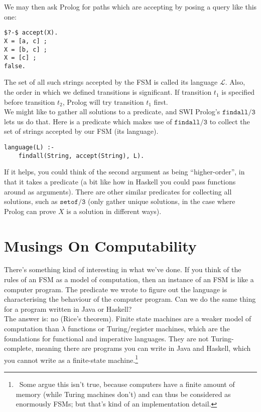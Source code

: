 \documentclass[a4paper,12pt]{article}
\newcommand{\kwa}[1]{\mathtt{#1}}
\begin{document}
\noindent
We may then ask Prolog for paths which are accepting by posing a query like this one:

\begin{lstlisting}
$?-$ accept(X).
X = [a, c] ;
X = [b, c] ;
X = [c] ;
false.
\end{lstlisting}

\noindent
The set of all such strings accepted by the FSM is called its language $\mathcal{L}$. Also, the order in which we defined transitions is significant. If transition $t_1$ is specified before transition $t_2$, Prolog will try transition $t_1$ first.\\

\noindent
We might like to gather all solutions to a predicate, and SWI Prolog's $\kwa{findall \slash 3}$ lets us do that. Here is a predicate which makes use of $\kwa{findall \slash 3}$ to collect the set of strings accepted by our FSM (its language).

\begin{lstlisting}
language(L) :-
    findall(String, accept(String), L).
\end{lstlisting}

\noindent
If it helps, you could think of the second argument as being ``higher-order'', in that it takes a predicate (a bit like how in Haskell you could pass functions around as arguments). There are other similar predicates for collecting all solutions, such as $\kwa{setof \slash 3}$ (only gather unique solutions, in the case where Prolog can prove $X$ is a solution in different ways). \\


\section{Musings On Computability}

\noindent
There's something kind of interesting in what we've done. If you think of the rules of an FSM as a model of computation, then an instance of an FSM is like a computer program. The predicate we wrote to figure out the language is characterising the behaviour of the computer program. Can we do the same thing for a program written in Java or Haskell? \\

\noindent
The answer is: no (Rice's theorem). Finite state machines are a weaker model of computation than $\lambda$ functions or Turing/register machines, which are the foundations for functional and imperative languages. They are not Turing-complete, meaning there are programs you can write in Java and Haskell, which you cannot write as a finite-state machine.\footnote{~Some argue this isn't true, because computers have a finite amount of memory (while Turing machines don't) and can thus be considered as enormously FSMs; but that's kind of an implementation detail.} \\
\end{document}
